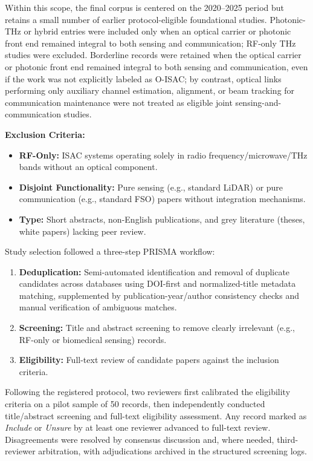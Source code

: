 \documentclass[letterpaper,journal]{IEEEtran}
\begin{document}
Within this scope, the final corpus is centered on the 2020--2025 period but retains a small number of earlier protocol-eligible foundational studies. Photonic-THz or hybrid entries were included only when an optical carrier or photonic front end remained integral to both sensing and communication; RF-only THz studies were excluded.
Borderline records were retained when the optical carrier or photonic front end remained integral to both sensing and communication, even if the work was not explicitly labeled as O-ISAC; by contrast, optical links performing only auxiliary channel estimation, alignment, or beam tracking for communication maintenance were not treated as eligible joint sensing-and-communication studies.

\textbf{Exclusion Criteria:}
\begin{itemize}
    \item \textbf{RF-Only:} ISAC systems operating solely in radio frequency/microwave/THz bands without an optical component.
    \item \textbf{Disjoint Functionality:} Pure sensing (e.g., standard LiDAR) or pure communication (e.g., standard FSO) papers without integration mechanisms.
    \item \textbf{Type:} Short abstracts, non-English publications, and grey literature (theses, white papers) lacking peer review.
\end{itemize}

Study selection followed a three-step PRISMA workflow:
\begin{enumerate}
    \item \textbf{Deduplication:} Semi-automated identification and removal of duplicate candidates across databases using DOI-first and normalized-title metadata matching, supplemented by publication-year/author consistency checks and manual verification of ambiguous matches.
    \item \textbf{Screening:} Title and abstract screening to remove clearly irrelevant (e.g., RF-only or biomedical sensing) records.
    \item \textbf{Eligibility:} Full-text review of candidate papers against the inclusion criteria.
\end{enumerate}

Following the registered protocol, two reviewers first calibrated the eligibility criteria on a pilot sample of 50 records, then independently conducted title/abstract screening and full-text eligibility assessment. Any record marked as \textit{Include} or \textit{Unsure} by at least one reviewer advanced to full-text review. Disagreements were resolved by consensus discussion and, where needed, third-reviewer arbitration, with adjudications archived in the structured screening logs.
\end{document}
